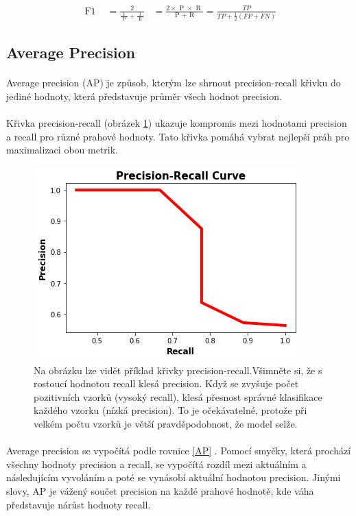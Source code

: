 \begin{equation}
\begin{aligned}
\text { F1 } & =\frac{2}{\frac{1}{\text { P }}+\frac{1}{\text { R }}}
& =\frac{2 \times \text { P } \times \text { R }}{\text { P }+ \text { R }}
=\frac{T P}{T P+\frac{1}{2}(F P+F N)}
\end{aligned}
\end{equation}

\subsection*{Average Precision}
\label{ap}
\paragraph{}Average precision (AP) \cite{ap} je způsob, kterým lze shrnout precision-recall křivku do jediné hodnoty, která představuje průměr všech hodnot precision.
\paragraph{} Křivka precision-recall (obrázek \ref{precision_recall}) ukazuje kompromis mezi hodnotami precision a recall pro různé prahové hodnoty. Tato křivka pomáhá vybrat nejlepší práh pro maximalizaci obou metrik.


\begin{figure}
    \centering
    \includegraphics[width=0.5\linewidth]{obrazky-figures/precision_recall.png}
    \caption{Na obrázku lze vidět příklad křivky precision-recall.Všimněte si, že s rostoucí hodnotou recall klesá precision. Když se zvyšuje počet pozitivních vzorků (vysoký recall), klesá přesnost správné klasifikace každého vzorku (nízká precision). To je očekávatelné, protože při velkém počtu vzorků je větší pravděpodobnost, že model selže\protect\footnotemark{}.}
    \label{precision_recall}
\end{figure}
 \paragraph{} Average precision se vypočítá podle rovnice \ref{AP} \cite{ap}. Pomocí smyčky, která prochází všechny hodnoty precision a recall, se vypočítá rozdíl mezi aktuálním a následujícím vyvoláním a poté se vynásobí aktuální hodnotou precision. Jinými slovy, AP je vážený součet precision na každé prahové hodnotě, kde váha představuje nárůst hodnoty recall.

